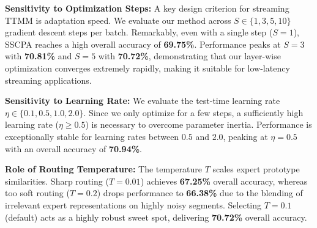 \documentclass{article}
\theoremstyle{plain}
\theoremstyle{definition}
\theoremstyle{remark}
\begin{document}
\textbf{Sensitivity to Optimization Steps:} A key design criterion for streaming TTMM is adaptation speed. We evaluate our method across $S \in \{1, 3, 5, 10\}$ gradient descent steps per batch. Remarkably, even with a single step ($S=1$), SSCPA reaches a high overall accuracy of \textbf{69.75\%}. Performance peaks at $S=3$ with \textbf{70.81\%} and $S=5$ with \textbf{70.72\%}, demonstrating that our layer-wise optimization converges extremely rapidly, making it suitable for low-latency streaming applications.

\textbf{Sensitivity to Learning Rate:} We evaluate the test-time learning rate $\eta \in \{0.1, 0.5, 1.0, 2.0\}$. Since we only optimize for a few steps, a sufficiently high learning rate ($\eta \geq 0.5$) is necessary to overcome parameter inertia. Performance is exceptionally stable for learning rates between $0.5$ and $2.0$, peaking at $\eta = 0.5$ with an overall accuracy of \textbf{70.94\%}.

\textbf{Role of Routing Temperature:} The temperature $T$ scales expert prototype similarities. Sharp routing ($T = 0.01$) achieves \textbf{67.25\%} overall accuracy, whereas too soft routing ($T=0.2$) drops performance to \textbf{66.38\%} due to the blending of irrelevant expert representations on highly noisy segments. Selecting $T=0.1$ (default) acts as a highly robust sweet spot, delivering \textbf{70.72\%} overall accuracy.
\end{document}
